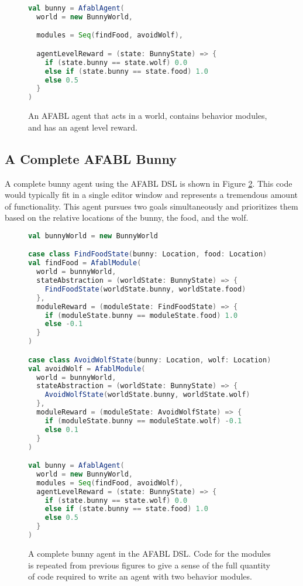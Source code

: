 \begin{figure}[!h]
\begin{center}

\begin{lstlisting}[language=Scala]
val bunny = AfablAgent(
  world = new BunnyWorld,

  modules = Seq(findFood, avoidWolf),

  agentLevelReward = (state: BunnyState) => {
    if (state.bunny == state.wolf) 0.0
    else if (state.bunny == state.food) 1.0
    else 0.5
  }
)
\end{lstlisting}

\caption{An AFABL agent that acts in a world, contains behavior modules, and has an agent level reward.}
\end{center}
\label{fig:afabl-bunny-code}
\end{figure}



\subsection{A Complete AFABL Bunny}

A complete bunny agent using the AFABL DSL is shown in Figure \ref{fig:afabl-bunny-code}. This code would typically fit in a single editor window and represents a tremendous amount of functionality. This agent pursues two goals simultaneously and prioritizes them based on the relative locations of the bunny, the food, and the wolf.

\begin{figure}[!h]
\begin{center}

\begin{lstlisting}[language=Scala]
val bunnyWorld = new BunnyWorld

case class FindFoodState(bunny: Location, food: Location)
val findFood = AfablModule(
  world = bunnyWorld,
  stateAbstraction = (worldState: BunnyState) => {
    FindFoodState(worldState.bunny, worldState.food)
  },
  moduleReward = (moduleState: FindFoodState) => {
    if (moduleState.bunny == moduleState.food) 1.0
    else -0.1
  }
)

case class AvoidWolfState(bunny: Location, wolf: Location)
val avoidWolf = AfablModule(
  world = bunnyWorld,
  stateAbstraction = (worldState: BunnyState) => {
    AvoidWolfState(worldState.bunny, worldState.wolf)
  },
  moduleReward = (moduleState: AvoidWolfState) => {
    if (moduleState.bunny == moduleState.wolf) -0.1
    else 0.1
  }
)

val bunny = AfablAgent(
  world = new BunnyWorld,
  modules = Seq(findFood, avoidWolf),
  agentLevelReward = (state: BunnyState) => {
    if (state.bunny == state.wolf) 0.0
    else if (state.bunny == state.food) 1.0
    else 0.5
  }
)
\end{lstlisting}

\caption{A complete bunny agent in the AFABL DSL. Code for the modules is repeated from previous figures to give a sense of the full quantity of code required to write an agent with two behavior modules.}
\end{center}
\label{fig:afabl-bunny-code}
\end{figure}

